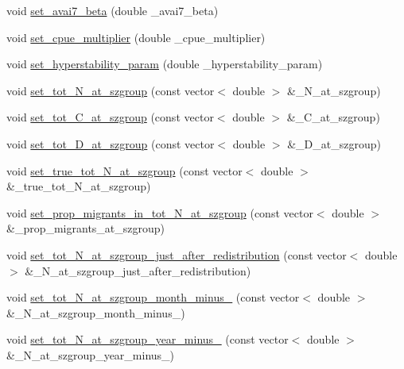 \begin{DoxyCompactItemize}
void \mbox{\hyperlink{class_population_ac3c20fa4ed3d7d4b0cfdee30b97ab15d}{set\+\_\+avai7\+\_\+beta}} (double \+\_\+avai7\+\_\+beta)
\item 
void \mbox{\hyperlink{class_population_a55aef29cf0f834568f2ca8841d925362}{set\+\_\+cpue\+\_\+multiplier}} (double \+\_\+cpue\+\_\+multiplier)
\item 
void \mbox{\hyperlink{class_population_a9406d88c38e04dc2a99b2958fda841d1}{set\+\_\+hyperstability\+\_\+param}} (double \+\_\+hyperstability\+\_\+param)
\item 
void \mbox{\hyperlink{class_population_ab2b125b67c0162045ef57d4a852a334c}{set\+\_\+tot\+\_\+\+N\+\_\+at\+\_\+szgroup}} (const vector$<$ double $>$ \&\+\_\+\+N\+\_\+at\+\_\+szgroup)
\item 
void \mbox{\hyperlink{class_population_a35ab8cd314f77601b3f7fa0a7112a1c3}{set\+\_\+tot\+\_\+\+C\+\_\+at\+\_\+szgroup}} (const vector$<$ double $>$ \&\+\_\+\+C\+\_\+at\+\_\+szgroup)
\item 
void \mbox{\hyperlink{class_population_a36b73df25c14a2b829a650cb1cb9a749}{set\+\_\+tot\+\_\+\+D\+\_\+at\+\_\+szgroup}} (const vector$<$ double $>$ \&\+\_\+\+D\+\_\+at\+\_\+szgroup)
\item 
void \mbox{\hyperlink{class_population_a1e9f13e5b19815245325c9b4f1b8dcf8}{set\+\_\+true\+\_\+tot\+\_\+\+N\+\_\+at\+\_\+szgroup}} (const vector$<$ double $>$ \&\+\_\+true\+\_\+tot\+\_\+\+N\+\_\+at\+\_\+szgroup)
\item 
void \mbox{\hyperlink{class_population_abb9b63e8de5e4f35e07267cdf318a8f3}{set\+\_\+prop\+\_\+migrants\+\_\+in\+\_\+tot\+\_\+\+N\+\_\+at\+\_\+szgroup}} (const vector$<$ double $>$ \&\+\_\+prop\+\_\+migrants\+\_\+at\+\_\+szgroup)
\item 
void \mbox{\hyperlink{class_population_a5e98fe6080d34a611c67b10cf0139beb}{set\+\_\+tot\+\_\+\+N\+\_\+at\+\_\+szgroup\+\_\+just\+\_\+after\+\_\+redistribution}} (const vector$<$ double $>$ \&\+\_\+\+N\+\_\+at\+\_\+szgroup\+\_\+just\+\_\+after\+\_\+redistribution)
\item 
void \mbox{\hyperlink{class_population_a1df1cac131a4fd1610b9b471eee767ea}{set\+\_\+tot\+\_\+\+N\+\_\+at\+\_\+szgroup\+\_\+month\+\_\+minus\+\_}} (const vector$<$ double $>$ \&\+\_\+\+N\+\_\+at\+\_\+szgroup\+\_\+month\+\_\+minus\+\_)
\item 
void \mbox{\hyperlink{class_population_a1dc336f602f0e0dfc6fd4219cc0e3b05}{set\+\_\+tot\+\_\+\+N\+\_\+at\+\_\+szgroup\+\_\+year\+\_\+minus\+\_}} (const vector$<$ double $>$ \&\+\_\+\+N\+\_\+at\+\_\+szgroup\+\_\+year\+\_\+minus\+\_)

\end{DoxyCompactItemize}
